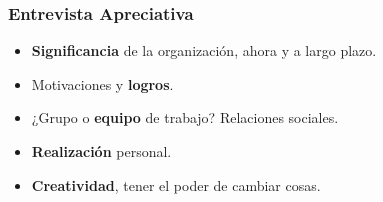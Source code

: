 \frame
{
\frametitle{Entrevista Apreciativa}

\begin{itemize}
    \item \textbf{Significancia} de la organización, ahora y a largo plazo.
    \item Motivaciones y \textbf{logros}.
    \item ¿Grupo o \textbf{equipo} de trabajo? Relaciones sociales.
    \item \textbf{Realización} personal.
    \item \textbf{Creatividad}, tener el poder de cambiar cosas.
\end{itemize}

}
